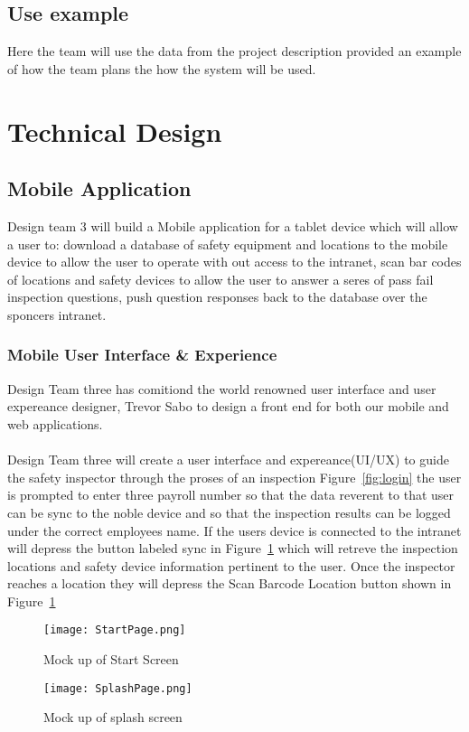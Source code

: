 \documentclass[Letter,11pt]{article}
\begin{document}
	\subsection{Use example}
		Here the team will use the data from the project description provided an example of how the team plans the how the system will be used.
		  
		
\section{Technical Design}
	
	\subsection{Mobile Application}
	Design team 3 will build a Mobile application for a tablet device which will allow a user to: download a database of safety equipment and locations to the mobile device to allow the user to operate with out access to the intranet, scan bar codes of locations and safety devices to allow the user to answer a seres of pass fail inspection questions, push question responses back to the database over the sponcers intranet.
	\subsubsection{Mobile User Interface \& Experience}
	Design Team three has comitiond the world renowned user interface and user expereance designer, Trevor Sabo to design a front end for both our mobile and web applications.\\
	\\
	Design Team three will create a user interface and expereance(UI/UX) to guide the safety inspector through the proses of an inspection Figure~\ref{fig:login} the user is prompted to enter three payroll number so that the data reverent to that user can be sync to the noble device and so that the inspection results can be logged under the correct employees name.
	If the users device is connected to the intranet will depress the button labeled sync in Figure~\ref{fig:splash} which will retreve the inspection locations and safety device information pertinent to the user.
	Once the inspector reaches a location they will depress the Scan Barcode Location button shown in Figure~\ref{fig:splash}
	\begin{figure}[h]
		
		\begin{minipage}{0.5\textwidth}
			\centering
			\texttt{[image: StartPage.png]}
			\caption{\label{fig:login}Mock up of Start Screen}
		\end{minipage}%
		\begin{minipage}{0.5\textwidth}
			\centering
			\texttt{[image: SplashPage.png]}
			\caption{\label{fig:splash}Mock up of splash screen}
		\end{minipage}
	\end{figure}
	
\end{document}
